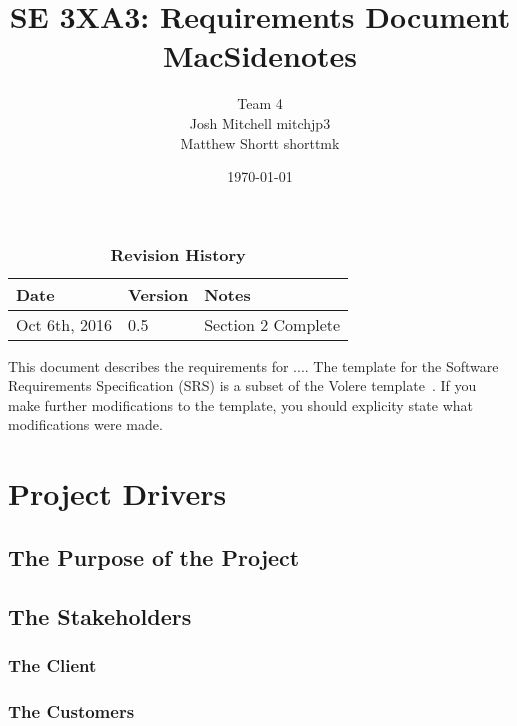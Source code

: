 \documentclass[12pt, titlepage]{article}
\title{SE 3XA3: Requirements Document\\MacSidenotes}
\author{Team 4
		\\ Josh Mitchell mitchjp3
		\\ Matthew Shortt shorttmk
}
\date{\today}
\begin{document}
\maketitle

\tableofcontents
\listoftables
\listoffigures



\begin{table}[bp]
\caption{\bf Revision History}
\begin{tabularx}{\textwidth}{p{3cm}p{2cm}X}
\toprule {\bf Date} & {\bf Version} & {\bf Notes}\\
\midrule
Oct 6th, 2016 & 0.5 & Section 2 Complete\\
\bottomrule
\end{tabularx}
\end{table}

\newpage



This document describes the requirements for ....  The template for the Software
Requirements Specification (SRS) is a subset of the Volere
template~\citep{RobertsonAndRobertson2012}.  If you make further modifications
to the template, you should explicity state what modifications were made.

\section{Project Drivers}

\subsection{The Purpose of the Project}

\subsection{The Stakeholders}

\subsubsection{The Client}

\subsubsection{The Customers}
\end{document}
